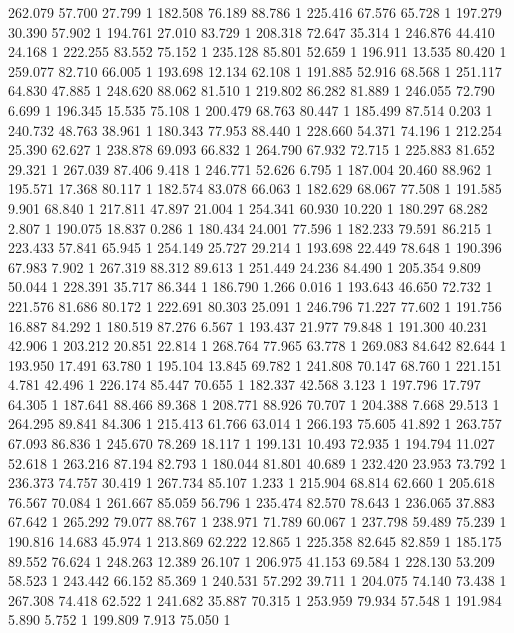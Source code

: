 	262.079	57.700	27.799	1
	182.508	76.189	88.786	1
	225.416	67.576	65.728	1
	197.279	30.390	57.902	1
	194.761	27.010	83.729	1
	208.318	72.647	35.314	1
	246.876	44.410	24.168	1
	222.255	83.552	75.152	1
	235.128	85.801	52.659	1
	196.911	13.535	80.420	1
	259.077	82.710	66.005	1
	193.698	12.134	62.108	1
	191.885	52.916	68.568	1
	251.117	64.830	47.885	1
	248.620	88.062	81.510	1
	219.802	86.282	81.889	1
	246.055	72.790	6.699	1
	196.345	15.535	75.108	1
	200.479	68.763	80.447	1
	185.499	87.514	0.203	1
	240.732	48.763	38.961	1
	180.343	77.953	88.440	1
	228.660	54.371	74.196	1
	212.254	25.390	62.627	1
	238.878	69.093	66.832	1
	264.790	67.932	72.715	1
	225.883	81.652	29.321	1
	267.039	87.406	9.418	1
	246.771	52.626	6.795	1
	187.004	20.460	88.962	1
	195.571	17.368	80.117	1
	182.574	83.078	66.063	1
	182.629	68.067	77.508	1
	191.585	9.901	68.840	1
	217.811	47.897	21.004	1
	254.341	60.930	10.220	1
	180.297	68.282	2.807	1
	190.075	18.837	0.286	1
	180.434	24.001	77.596	1
	182.233	79.591	86.215	1
	223.433	57.841	65.945	1
	254.149	25.727	29.214	1
	193.698	22.449	78.648	1
	190.396	67.983	7.902	1
	267.319	88.312	89.613	1
	251.449	24.236	84.490	1
	205.354	9.809	50.044	1
	228.391	35.717	86.344	1
	186.790	1.266	0.016	1
	193.643	46.650	72.732	1
	221.576	81.686	80.172	1
	222.691	80.303	25.091	1
	246.796	71.227	77.602	1
	191.756	16.887	84.292	1
	180.519	87.276	6.567	1
	193.437	21.977	79.848	1
	191.300	40.231	42.906	1
	203.212	20.851	22.814	1
	268.764	77.965	63.778	1
	269.083	84.642	82.644	1
	193.950	17.491	63.780	1
	195.104	13.845	69.782	1
	241.808	70.147	68.760	1
	221.151	4.781	42.496	1
	226.174	85.447	70.655	1
	182.337	42.568	3.123	1
	197.796	17.797	64.305	1
	187.641	88.466	89.368	1
	208.771	88.926	70.707	1
	204.388	7.668	29.513	1
	264.295	89.841	84.306	1
	215.413	61.766	63.014	1
	266.193	75.605	41.892	1
	263.757	67.093	86.836	1
	245.670	78.269	18.117	1
	199.131	10.493	72.935	1
	194.794	11.027	52.618	1
	263.216	87.194	82.793	1
	180.044	81.801	40.689	1
	232.420	23.953	73.792	1
	236.373	74.757	30.419	1
	267.734	85.107	1.233	1
	215.904	68.814	62.660	1
	205.618	76.567	70.084	1
	261.667	85.059	56.796	1
	235.474	82.570	78.643	1
	236.065	37.883	67.642	1
	265.292	79.077	88.767	1
	238.971	71.789	60.067	1
	237.798	59.489	75.239	1
	190.816	14.683	45.974	1
	213.869	62.222	12.865	1
	225.358	82.645	82.859	1
	185.175	89.552	76.624	1
	248.263	12.389	26.107	1
	206.975	41.153	69.584	1
	228.130	53.209	58.523	1
	243.442	66.152	85.369	1
	240.531	57.292	39.711	1
	204.075	74.140	73.438	1
	267.308	74.418	62.522	1
	241.682	35.887	70.315	1
	253.959	79.934	57.548	1
	191.984	5.890	5.752	1
	199.809	7.913	75.050	1
